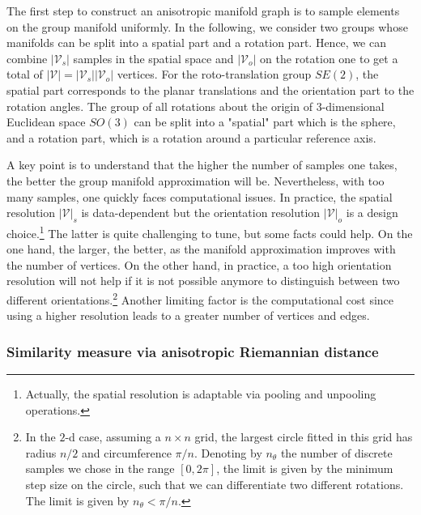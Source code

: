 \documentclass{article}
\begin{document}
The first step to construct an anisotropic manifold graph is to sample elements on the group manifold uniformly. In the following, we consider two groups whose manifolds can be split into a spatial part and a rotation part. Hence, we can combine $|\mathcal{V}_s|$ samples in the spatial space and $|\mathcal{V}_o|$ on the rotation one to get a total of $|\mathcal{V}| = |\mathcal{V}_s| |\mathcal{V}_o|$ vertices. For the roto-translation group  $SE(2)$, the spatial part corresponds to the planar translations and the orientation part to the rotation angles. The group of all rotations about the origin of 3-dimensional Euclidean space $SO(3)$ can be split into a "spatial" part which is the sphere, and a rotation part, which is a rotation around a particular reference axis.

A key point is to understand that the higher the number of samples one takes, the better the group manifold approximation will be. Nevertheless, with too many samples, one quickly faces computational issues. In practice, the spatial resolution $|\mathcal{V}|_s$ is data-dependent but the orientation resolution $|\mathcal{V}|_o$ is a design choice.\footnote{Actually, the spatial resolution is adaptable via pooling and unpooling operations.} The latter is quite challenging to tune, but some facts could help. On the one hand, the larger, the better, as the manifold approximation improves with the number of vertices. On the other hand, in practice, a too high orientation resolution will not help if it is not possible anymore to distinguish between two different orientations.\footnote{In the $2$-d case, assuming a $n \times n$ grid, the largest circle fitted in this grid has radius $n/2$ and circumference $\pi/n$. Denoting by $n_\theta$ the number of discrete samples we chose in the range $[0, 2\pi]$, the limit is given by the minimum step size on the circle, such that we can differentiate two different rotations. The limit is given by $n_\theta < \pi / n$.} Another limiting factor is the computational cost since using a higher resolution leads to a greater number of vertices and edges.

\subsubsection{Similarity measure via anisotropic Riemannian distance}
\end{document}
